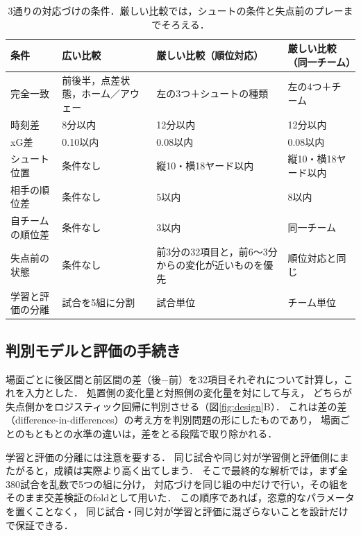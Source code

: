 \documentclass[11pt]{ujarticle} %
\begin{document}
\begin{table}[htbp]
    \centering
    \caption{3通りの対応づけの条件．厳しい比較では，シュートの条件と失点前のプレーまでそろえる．}
    \label{tab:matching}
    \begin{tabular}{|p{3.0cm}|p{3.5cm}|p{4.0cm}|p{3.5cm}|}
    \hline
    条件 & 広い比較 & 厳しい比較\newline （順位対応） & 厳しい比較\newline （同一チーム） \\
    \hline
    完全一致 & 前後半，点差状態，ホーム／アウェー &
    左の3つ＋シュートの種類 & 左の4つ＋チーム \\
    \hline
    時刻差 & 8分以内 & 12分以内 & 12分以内 \\
    \hline
    xG差 & 0.10以内 & 0.08以内 & 0.08以内 \\
    \hline
    シュート位置 & 条件なし & 縦10・横18ヤード以内 & 縦10・横18ヤード以内 \\
    \hline
    相手の順位差 & 条件なし & 5以内 & 8以内 \\
    \hline
    自チームの順位差 & 条件なし & 3以内 & 同一チーム \\
    \hline
    失点前の状態 & 条件なし &
    前3分の32項目と，前6〜3分からの変化が近いものを優先 &
    順位対応と同じ \\
    \hline
    学習と評価の分離 & 試合を5組に分割 & 試合単位 & チーム単位 \\
    \hline
    \end{tabular}
\end{table}

\subsection{判別モデルと評価の手続き}

場面ごとに後区間と前区間の差（後$-$前）を32項目それぞれについて計算し，これを入力とした．
処置側の変化量と対照側の変化量を対にして与え，
どちらが失点側かをロジスティック回帰に判別させる（図\ref{fig:design}B）．
これは差の差（difference-in-differences）の考え方を判別問題の形にしたものであり，
場面ごとのもともとの水準の違いは，差をとる段階で取り除かれる．

学習と評価の分離には注意を要する．
同じ試合や同じ対が学習側と評価側にまたがると，成績は実際より高く出てしまう．
そこで最終的な解析では，まず全380試合を乱数で5つの組に分け，
対応づけを同じ組の中だけで行い，その組をそのまま交差検証のfoldとして用いた．
この順序であれば，恣意的なパラメータを置くことなく，
同じ試合・同じ対が学習と評価に混ざらないことを設計だけで保証できる．
\end{document}
